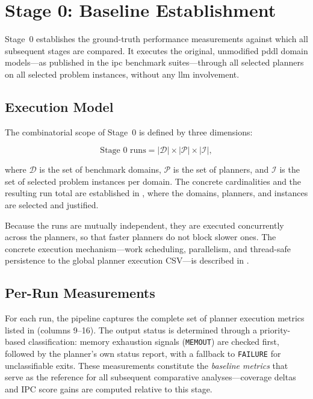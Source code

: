 \section{Stage 0: Baseline Establishment}
\label{sec:design:stage0}

Stage~0 establishes the ground-truth performance measurements against which all subsequent stages are compared.
It executes the original, unmodified \gls{pddl} domain models---as published in the \gls{ipc} benchmark suites---through all selected planners on all selected problem instances, without any \gls{llm} involvement.

\subsection{Execution Model}
\label{sec:design:stage0:execution}

The combinatorial scope of Stage~0 is defined by three dimensions:

\begin{equation}\label{eq:stage0_runs}
  \text{Stage~0 runs} = |\mathcal{D}| \times |\mathcal{P}| \times |\mathcal{I}|,
\end{equation}

\noindent where $\mathcal{D}$ is the set of benchmark domains, $\mathcal{P}$ is the set of planners, and $\mathcal{I}$ is the set of selected problem instances per domain. The concrete cardinalities and the resulting run total are established in , where the domains, planners, and instances are selected and justified.

Because the runs are mutually independent, they are executed concurrently across the planners, so that faster planners do not block slower ones.
The concrete execution mechanism---work scheduling, parallelism, and thread-safe persistence to the global planner execution CSV---is described in .

\subsection{Per-Run Measurements}
\label{sec:design:stage0:metrics}

For each run, the pipeline captures the complete set of planner execution metrics listed in  (columns 9--16).
The output status is determined through a priority-based classification: memory exhaustion signals (\texttt{MEMOUT}) are checked first, followed by the planner's own status report, with a fallback to \texttt{FAILURE} for unclassifiable exits.
These measurements constitute the \emph{baseline metrics} that serve as the reference for all subsequent comparative analyses---coverage deltas and IPC score gains are computed relative to this stage.

